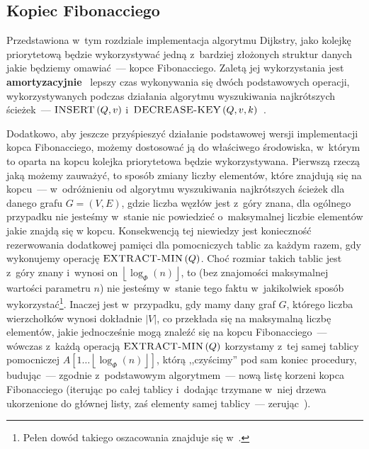\subsection{Kopiec Fibonacciego}



Przedstawiona w~tym rozdziale implementacja algorytmu Dijkstry, jako kolejkę priorytetową będzie wykorzystywać jedną z~bardziej złożonych struktur danych jakie będziemy omawiać~--- kopce Fibonacciego.
Zaletą jej wykorzystania jest \textbf{amortyzacyjnie}~\cite[$17$]{Cormen} lepszy czas wykonywania się dwóch podstawowych operacji, wykorzystywanych podczas działania algorytmu wyszukiwania najkrótszych ścieżek~--- $\textrm{\textsc{INSERT}} \left( Q, v \right)$ i~$\textrm{\textsc{DECREASE-KEY}} \left( Q, v, k \right)$~\cite[$514$]{Cormen}.

Dodatkowo, aby jeszcze przyśpieszyć działanie podstawowej wersji implementacji kopca Fibonacciego, możemy dostosować ją do właściwego środowiska, w~którym to oparta na kopcu kolejka priorytetowa będzie wykorzystywana.
Pierwszą rzeczą jaką możemy zauważyć, to sposób zmiany liczby elementów, które znajdują się na kopcu~--- w~odróżnieniu od algorytmu wyszukiwania najkrótszych ścieżek dla danego grafu $G = \left( V, E \right)$, gdzie liczba węzłów jest z~góry znana, dla ogólnego przypadku nie jesteśmy w~stanie nic powiedzieć o~maksymalnej liczbie elementów jakie znajdą się w kopcu.
Konsekwencją tej niewiedzy jest konieczność rezerwowania dodatkowej pamięci dla pomocniczych tablic za każdym razem, gdy wykonujemy operację $\textrm{\textsc{EXTRACT-MIN}} \left( Q \right)$.
Choć rozmiar takich tablic jest z~góry znany i~wynosi on $\left \lfloor \log_{\Phi} \left( n \right) \right \rfloor$, to (bez znajomości maksymalnej wartości parametru $n$) nie jesteśmy w~stanie tego faktu w~jakikolwiek sposób wykorzystać\footnote{
	Pełen dowód takiego oszacowania znajduje się w~\cite[$19.4$]{Cormen}.
}.
Inaczej jest w~przypadku, gdy mamy dany graf $G$, którego liczba wierzchołków wynosi dokładnie $\left| V \right|$, co przekłada się na maksymalną liczbę elementów, jakie jednocześnie mogą znaleźć się na kopcu Fibonacciego~--- wówczas z~każdą operacją $\textrm{\textsc{EXTRACT-MIN}} \left( Q \right)$ korzystamy z~tej samej tablicy pomocniczej $A \left[ 1 \dots \left \lfloor \log_{\Phi} \left( n \right) \right \rfloor \right]$, którą ,,czyścimy'' pod sam koniec procedury, budując~--- zgodnie z~podstawowym algorytmem~--- nową listę korzeni kopca Fibonacciego (iterując po całej tablicy i~dodając trzymane w~niej drzewa ukorzenione do głównej listy, zaś elementy samej tablicy~--- zerując~\cite[$523$--$524$]{Cormen}).

